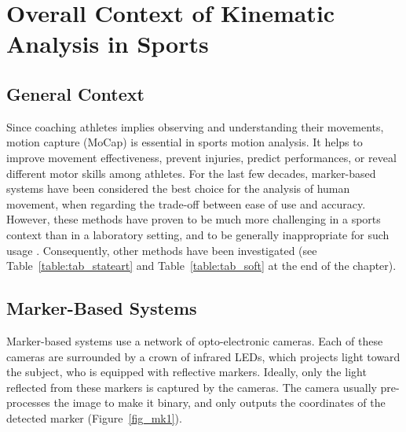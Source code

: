 \minitoc
\newpage



\FloatBarrier
\section{Overall Context of Kinematic Analysis in Sports}
\subsection{General Context}

Since coaching athletes implies observing and understanding their movements, motion capture (MoCap) is essential in sports motion analysis. It helps to improve movement effectiveness, prevent injuries, predict performances, or reveal different motor skills among athletes. For the last few decades, marker-based systems have been considered the best choice for the analysis of human movement, when regarding the trade-off between ease of use and accuracy. However, these methods have proven to be much more challenging in a sports context than in a laboratory setting, and to be generally inappropriate for such usage \cite{Mündermann2006, Colyer2018}. Consequently, other methods have been investigated (see Table~\ref{table:tab_stateart} and Table~\ref{table:tab_soft} at the end of the chapter).

\subsection{Marker-Based Systems}

Marker-based systems use a network of opto-electronic cameras. Each of these cameras are surrounded by a crown of infrared LEDs, which projects light toward the subject, who is equipped with reflective markers. Ideally, only the light reflected from these markers is captured by the cameras. The camera usually pre-processes the image to make it binary, and only outputs the coordinates of the detected marker (Figure~\ref{fig_mk1}). 

